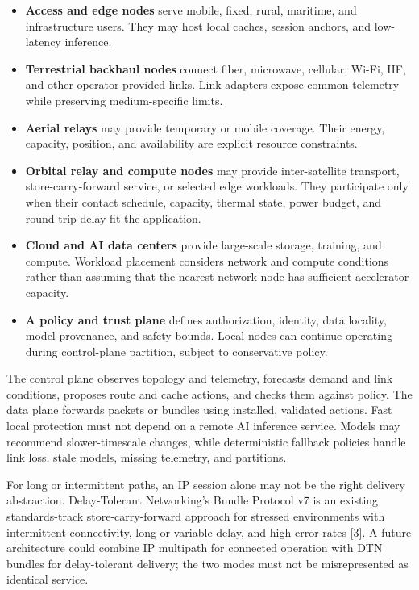 \documentclass[
  american,
  11pt,
]{article}
\providecommand{\tightlist}{%
  \setlength{\itemsep}{0pt}\setlength{\parskip}{0pt}}
\begin{document}
\begin{itemize}
\tightlist
\item
  \textbf{Access and edge nodes} serve mobile, fixed, rural, maritime,
  and infrastructure users. They may host local caches, session anchors,
  and low-latency inference.
\item
  \textbf{Terrestrial backhaul nodes} connect fiber, microwave,
  cellular, Wi-Fi, HF, and other operator-provided links. Link adapters
  expose common telemetry while preserving medium-specific limits.
\item
  \textbf{Aerial relays} may provide temporary or mobile coverage. Their
  energy, capacity, position, and availability are explicit resource
  constraints.
\item
  \textbf{Orbital relay and compute nodes} may provide inter-satellite
  transport, store-carry-forward service, or selected edge workloads.
  They participate only when their contact schedule, capacity, thermal
  state, power budget, and round-trip delay fit the application.
\item
  \textbf{Cloud and AI data centers} provide large-scale storage,
  training, and compute. Workload placement considers network and
  compute conditions rather than assuming that the nearest network node
  has sufficient accelerator capacity.
\item
  \textbf{A policy and trust plane} defines authorization, identity,
  data locality, model provenance, and safety bounds. Local nodes can
  continue operating during control-plane partition, subject to
  conservative policy.
\end{itemize}

The control plane observes topology and telemetry, forecasts demand and
link conditions, proposes route and cache actions, and checks them
against policy. The data plane forwards packets or bundles using
installed, validated actions. Fast local protection must not depend on a
remote AI inference service. Models may recommend slower-timescale
changes, while deterministic fallback policies handle link loss, stale
models, missing telemetry, and partitions.

For long or intermittent paths, an IP session alone may not be the right
delivery abstraction. Delay-Tolerant Networking's Bundle Protocol v7 is
an existing standards-track store-carry-forward approach for stressed
environments with intermittent connectivity, long or variable delay, and
high error rates {[}3{]}. A future architecture could combine IP
multipath for connected operation with DTN bundles for delay-tolerant
delivery; the two modes must not be misrepresented as identical service.
\end{document}
